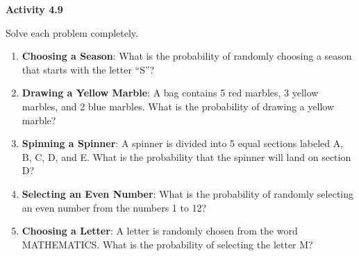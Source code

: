  \vspace{0.3ex}
\noindent\textbf{Activity 4.9}

\vspace{0.2ex}

Solve each problem completely.
\begin{enumerate}[noitemsep, label = \color{blue}\arabic*. ]
    
    
    
    
    
    \item \textbf{Choosing a Season}: What is the probability of randomly choosing a season that starts with the letter “S”?
    
    \item \textbf{Drawing a Yellow Marble}: A bag contains 5 red marbles, 3 yellow marbles, and 2 blue marbles. What is the probability of drawing a yellow marble?
    
    \item \textbf{Spinning a Spinner}: A spinner is divided into 5 equal sections labeled A, B, C, D, and E. What is the probability that the spinner will land on section D?
    
    \item \textbf{Selecting an Even Number}: What is the probability of randomly selecting an even number from the numbers 1 to 12?
    
    \item \textbf{Choosing a Letter}: A letter is randomly chosen from the word MATHEMATICS. What is the probability of selecting the letter M?
\end{enumerate}


